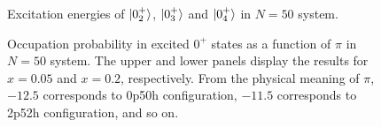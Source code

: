 \documentclass[%
superscriptaddress,
preprint,
showpacs,
nofootinbib,
amsmath,amssymb,
prc,
floatfix ]%
{revtex4-1}
\begin{document}

\begin{figure}[htbp]
 \begin{center}
 \end{center}
 \caption{Excitation energies of $\ket{0_2^+}$, $\ket{0_3^+}$ and $\ket{0_4^+}$ in $N=50$ system.}
 \label{fig:N50energy}
\end{figure}

\begin{figure}[htbp]
 \begin{minipage}{1\hsize}
 \begin{center}
 \end{center}
 \end{minipage}
 \begin{minipage}{1\hsize}
 \begin{center}
 \end{center}
 \end{minipage}
 \caption{Occupation probability in excited $0^+$ states as a function of $\pi$ in $N=50$ system. The upper and lower panels display the results for $x=0.05$ and $x=0.2$, respectively. From the physical meaning of $\pi$, $-12.5$ corresponds to 0p50h configuration, $-11.5$ corresponds to 2p52h configuration, and so on.}
 \label{fig:N50_occ}
\end{figure}
\end{document}
